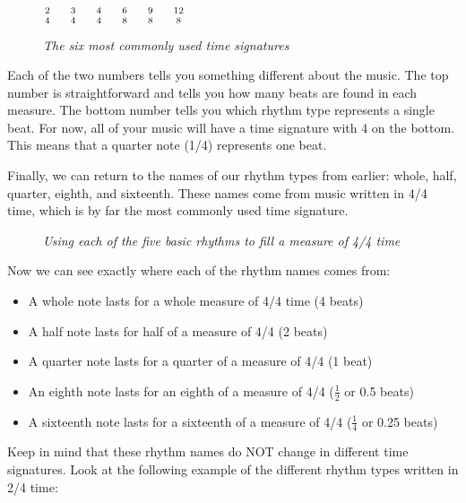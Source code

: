 \begin{figure}[h]
	\begin{center}
		\huge {
		${2 \atop 4} \hspace{5mm} {3 \atop 4} \hspace{5mm} {4 \atop 4} \hspace{5mm} {6 \atop 8} \hspace{5mm} {9 \atop 8} \hspace{5mm} {12 \atop 8}$
		}
	\end{center}
	\caption{\textit{The six most commonly used time signatures}}
\end{figure}

Each of the two numbers tells you something different about the music. The top number is straightforward and tells you how many beats are found in each measure. The bottom number tells you which rhythm type represents a single beat. For now, all of your music will have a time signature with 4 on the bottom. This means that a quarter note (1/4) represents one beat.

Finally, we can return to the names of our rhythm types from earlier: whole, half, quarter, eighth, and sixteenth. These names come from music written in 4/4 time, which is by far the most commonly used time signature. 

\begin{figure}[h]
	\begin{center}
	\end{center}
	\caption{\textit{Using each of the five basic rhythms to fill a measure of 4/4 time}}
\end{figure}

Now we can see exactly where each of the rhythm names comes from:

\begin{itemize}
	\item A whole note lasts for a whole measure of 4/4 time (4 beats)
	\item A half note lasts for half of a measure of 4/4 (2 beats)
	\item A quarter note lasts for a quarter of a measure of 4/4 (1 beat)
	\item An eighth note lasts for an eighth of a measure of 4/4 ($\frac{1}{2}$ or 0.5 beats)
	\item A sixteenth note lasts for a sixteenth of a measure of 4/4 ($\frac{1}{4}$ or 0.25 beats)
\end{itemize}

Keep in mind that these rhythm names do NOT change in different time signatures. Look at the following example of the different rhythm types written in 2/4 time:

